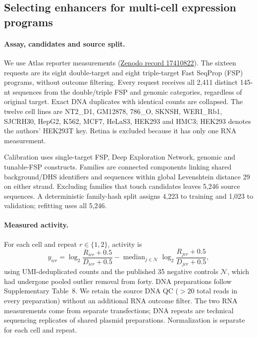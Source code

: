 \subsection{Selecting enhancers for multi-cell expression programs}
\label{app:multicell-programming}

\paragraph[Assay, candidates and source split.]{\label{app:multicell-split}Assay, candidates and source split.}
We use Atlas reporter measurements \citep{castillohair2025atlas}
(\href{https://zenodo.org/records/17410822}{Zenodo record 17410822}).
The sixteen requests are its eight double-target and eight triple-target
Fast SeqProp (FSP) programs, without outcome filtering. Every request receives
all 2,411 distinct 145-nt sequences from the double/triple FSP and genomic
categories, regardless of original target. Exact DNA duplicates with identical
counts are collapsed. The twelve cell lines are NT2\_D1,
GM12878, 786\_O, SKNSH, WERI\_Rb1, SJCRH30, HepG2, K562, MCF7, HeLaS3, HEK293
and HMC3; HEK293 denotes the authors' HEK293T key. Retina is excluded because
it has only one RNA measurement.

Calibration uses single-target FSP, Deep Exploration Network, genomic and
tunable-FSP constructs. Families are connected components linking shared
background/DHS identifiers and sequences within global Levenshtein distance 29
on either strand. Excluding
families that touch candidates leaves 5,246 source sequences. A deterministic
family-hash split assigns 4,223 to training and 1,023 to validation; refitting
uses all 5,246.

\paragraph{Measured activity.}
For each cell and repeat $r\in\{1,2\}$, activity is
\[
 y_{icr}=\log_2\frac{R_{icr}+0.5}{D_{icr}+0.5}
 -\operatorname{median}_{j\in\mathcal N}
   \log_2\frac{R_{jcr}+0.5}{D_{jcr}+0.5},
\]
using UMI-deduplicated counts and the published 35 negative controls $\mathcal N$,
which had undergone pooled outlier removal from forty. DNA preparations follow
Supplementary Table~8. We retain the source DNA QC ($>20$ total reads in every
preparation) without an additional RNA outcome filter. The two RNA measurements come from separate
transfections; DNA repeats are technical sequencing replicates of shared plasmid
preparations. Normalization is separate for each cell and repeat.

